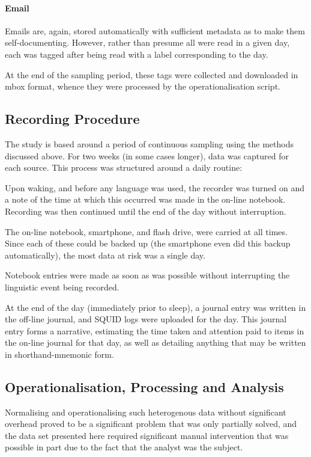 \paragraph{Email}
Emails are, again, stored automatically with sufficient metadata as to make them self-documenting.  However, rather than presume all were read in a given day, each was tagged after being read with a label corresponding to the day.

At the end of the sampling period, these tags were collected and downloaded in mbox format, whence they were processed by the operationalisation script.









\subsection{Recording Procedure}
\label{sec:personal:recording}
The study is based around a period of continuous sampling using the methods discussed above.  For two weeks (in some cases longer), data was captured for each source.  This process was structured around a daily routine:

Upon waking, and before any language was used, the recorder was turned on and a note of the time at which this occurred was made in the on-line notebook.  Recording was then continued until the end of the day without interruption.

The on-line notebook, smartphone, and flash drive, were carried at all times.  Since each of these could be backed up (the smartphone even did this backup automatically), the most data at risk was a single day.

Notebook entries were made as soon as was possible without interrupting the linguistic event being recorded.

At the end of the day (immediately prior to sleep), a journal entry was written in the off-line journal, and SQUID logs were uploaded for the day.  This journal entry forms a narrative, estimating the time taken and attention paid to items in the on-line journal for that day, as well as detailing anything that may be written in shorthand-mnemonic form.










\subsection{Operationalisation, Processing and Analysis}
Normalising and operationalising such heterogenous data without significant overhead proved to be a significant problem that was only partially solved, and the data set presented here required significant manual intervention that was possible in part due to the fact that the analyst was the subject.


